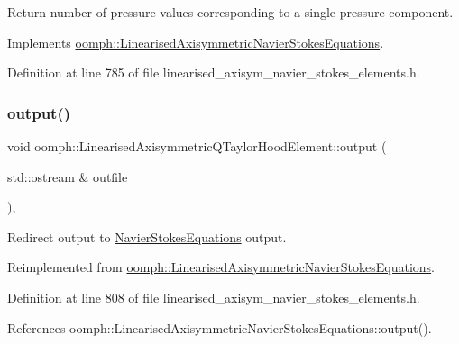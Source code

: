 Return number of pressure values corresponding to a single pressure component. 



Implements \hyperlink{classoomph_1_1LinearisedAxisymmetricNavierStokesEquations_aad6f1582b4516aae4fe0ce3c9e2d16c2}{oomph\+::\+Linearised\+Axisymmetric\+Navier\+Stokes\+Equations}.



Definition at line 785 of file linearised\+\_\+axisym\+\_\+navier\+\_\+stokes\+\_\+elements.\+h.

\mbox{\label{classoomph_1_1LinearisedAxisymmetricQTaylorHoodElement_a00768ef22cca932f04e2e10b0f779c48}} 
\subsubsection{\texorpdfstring{output()}{output()}\hspace{0.1cm}{\footnotesize\ttfamily [1/4]}}
{\footnotesize\ttfamily void oomph\+::\+Linearised\+Axisymmetric\+Q\+Taylor\+Hood\+Element\+::output (\begin{DoxyParamCaption}\item[{std\+::ostream \&}]{outfile }\end{DoxyParamCaption})\hspace{0.3cm}{\ttfamily [inline]}, {\ttfamily [virtual]}}



Redirect output to \hyperlink{classoomph_1_1NavierStokesEquations}{Navier\+Stokes\+Equations} output. 



Reimplemented from \hyperlink{classoomph_1_1LinearisedAxisymmetricNavierStokesEquations_a70e8f2426b53160afabe2f6dce78b920}{oomph\+::\+Linearised\+Axisymmetric\+Navier\+Stokes\+Equations}.



Definition at line 808 of file linearised\+\_\+axisym\+\_\+navier\+\_\+stokes\+\_\+elements.\+h.



References oomph\+::\+Linearised\+Axisymmetric\+Navier\+Stokes\+Equations\+::output().

